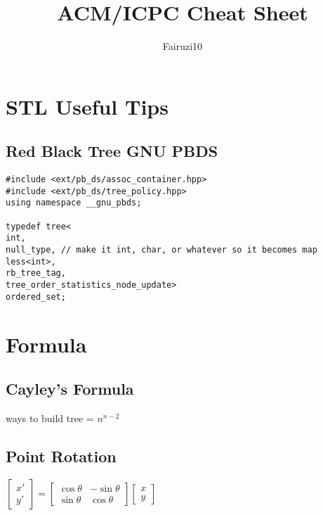 \documentclass[a4paper]{article}
\title{\textbf{ACM/ICPC Cheat Sheet}}
\author{Fairuzi10}
\date{}
\begin{document}
\maketitle
\thispagestyle{empty}

\section{STL Useful Tips}

\subsection{Red Black Tree GNU PBDS}
\begin{verbatim}
#include <ext/pb_ds/assoc_container.hpp>
#include <ext/pb_ds/tree_policy.hpp>
using namespace __gnu_pbds;

typedef tree<
int,
null_type, // make it int, char, or whatever so it becomes map
less<int>,
rb_tree_tag,
tree_order_statistics_node_update>
ordered_set;
\end{verbatim}

\section{Formula}

\subsection{Cayley's Formula}
ways to build tree = $n^{n-2}$

\subsection{Point Rotation}
$\begin{bmatrix} x' \\ y' \end{bmatrix} = \begin{bmatrix} \cos { \theta  }  & -\sin { \theta  }  \\ \sin { \theta  }  & \cos { \theta  }  \end{bmatrix}\begin{bmatrix} x \\ y \end{bmatrix}$
\end{document}
